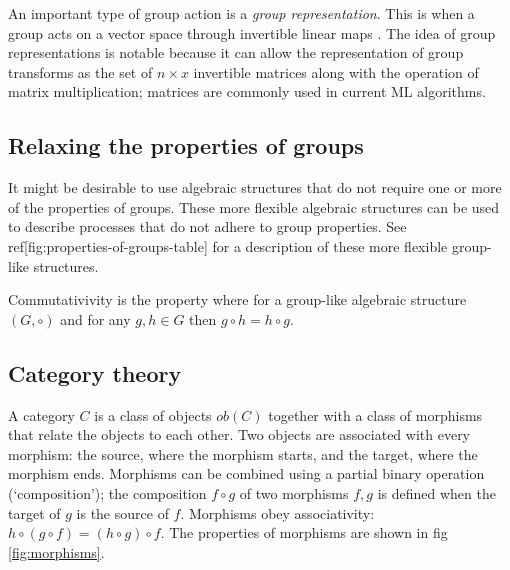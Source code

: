An important type of group action is a \textit{group representation}.
This is when a group acts on a vector space through invertible linear maps \autocite{Mathworld-group}.
The idea of group representations is notable because it can allow the representation of group transforms as the set of $n\times x$ invertible matrices along with the operation of matrix multiplication; matrices are commonly used in current ML algorithms.


\subsection{Relaxing the properties of groups}\label{sec:Relaxing the properties of groups}

It might be desirable to use algebraic structures that do not require one or more of the properties of groups.
These more flexible algebraic structures can be used to describe processes that do not adhere to group properties.
See ref[fig:properties-of-groups-table] for a description of these more flexible group-like structures.
\begin{fullwidth}

\end{fullwidth}

Commutativivity is the property where for a group-like algebraic structure $(G, \circ)$ and for any $g,h \in G$ then $g \circ h = h \circ g$.

\subsection{Category theory}

A category $C$ is a class of objects $ob(C)$ together with a class of morphisms that relate the objects to each other.
Two objects are associated with every morphism: the source, where the morphism starts, and the target, where the morphism ends.
Morphisms can be combined using a partial binary operation (`composition'); the composition $f \circ g$ of two morphisms $f, g$ is defined when the target of $g$ is the source of $f$.
Morphisms obey associativity: $h \circ (g \circ f) = (h \circ g) \circ f$.
The properties of morphisms are shown in fig \ref{fig:morphisms}.

